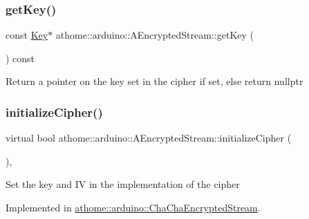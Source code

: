\subsubsection{\texorpdfstring{get\+Key()}{getKey()}}
{\footnotesize\ttfamily const \mbox{\hyperlink{classathome_1_1arduino_1_1_a_encrypted_stream_a2f0fd4a9c2a74a4ae857a4447aa3956f}{Key}}$\ast$ athome\+::arduino\+::\+A\+Encrypted\+Stream\+::get\+Key (\begin{DoxyParamCaption}{ }\end{DoxyParamCaption}) const\hspace{0.3cm}{\ttfamily [inline]}}

Return a pointer on the key set in the cipher if set, else return nullptr \mbox{\label{classathome_1_1arduino_1_1_a_encrypted_stream_a7b167d800f8ccb734228ed8e5b09d553}} 
\subsubsection{\texorpdfstring{initialize\+Cipher()}{initializeCipher()}}
{\footnotesize\ttfamily virtual bool athome\+::arduino\+::\+A\+Encrypted\+Stream\+::initialize\+Cipher (\begin{DoxyParamCaption}\item[{const \mbox{\hyperlink{classathome_1_1arduino_1_1_a_encrypted_stream_a67d68ce9b0daa19296b38c9bb3a5aee7}{Cipher\+Materials}} \&}]{ }\end{DoxyParamCaption})\hspace{0.3cm}{\ttfamily [protected]}, {}}

Set the key and IV in the implementation of the cipher 

Implemented in \mbox{\hyperlink{classathome_1_1arduino_1_1_cha_cha_encrypted_stream_adc55767997450f10d99a6e907a9c95ff}{athome\+::arduino\+::\+Cha\+Cha\+Encrypted\+Stream}}.

\mbox{\label{classathome_1_1arduino_1_1_a_encrypted_stream_a123e12bccac92a0253e1df61c7e66207}} 
